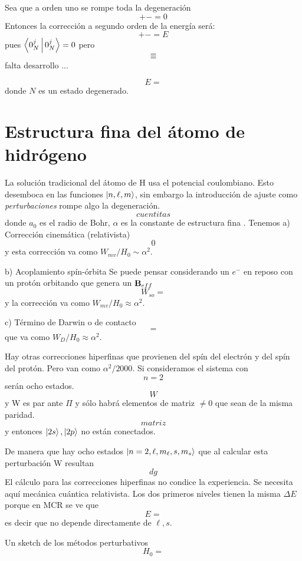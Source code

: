 \documentclass[10pt,oneside]{CBFT_book}
\begin{document}
Sea que a orden uno se rompe toda la degeneración 
\[
	+ - = 0
\]
Entonces la corrección a segundo orden de la energía será:
\[
	+ - = E
\]
pues $\Braket{0_N^j|0_N^j}= 0$ pero 
\[
	=
\]
\[
	=
\]
falta desarrollo ...

\[
	E =
\]
donde $N$ es un estado degenerado.

\section{Estructura fina del átomo de hidrógeno}

La solución tradicional del átomo de H usa el potencial coulombiano. Esto desemboca en las funciones 
$\Ket{n,\ell,m}$, sin embargo la introducción de ajuste como {\it perturbaciones} rompe algo la degeneración.
\[
	cuentitas
\]
donde $a_0$ es el radio de Bohr, $\alpha$ es la constante de estructura fina .
Tenemos 
a) Corrección cinemática (relativista)
\[	
	0
\]
y esta corrección va como $W_{mv}/H_0 \sim \alpha^2$.

b) Acoplamiento spín-órbita
Se puede pensar considerando un $e^-$ en reposo con un protón orbitando que genera un $\vb{B}_{eff}$
\[
	W_{so} =
\]
y la corrección va como $W_{mv}/H_0 \approx \alpha^2$.

c) Término de Darwin o de contacto
\[
	=
\]
que va como  $W_{D}/H_0 \approx \alpha^2$.

Hay otras correcciones hiperfinas que provienen del spín del electrón y del spín del protón. Pero van como 
$\alpha^2/2000$.
Si consideramos el sistema con 
\[
	n=2
\]
serán ocho estados.
\[
	W
\]
y W es par ante $\Pi$ y sólo habrá elementos de matriz $\neq 0$ que sean de la misma paridad.
\[
	matriz
\]
y entonces $\Ket{2s}, \Ket{2p}$ no están conectados.

De manera que hay ocho estados $\Ket{n=2,\ell,m_\ell,s,m_s}$ que al calcular esta perturbación W resultan 
\[
	dg
\]
El cálculo para las correcciones hiperfinas no condice la experiencia. Se necesita aquí mecánica cuántica 
relativista. Los dos primeros niveles tienen la misma $\Delta E$ porque en MCR se ve que 
\[
	E = 
\]
es decir que no depende directamente de $\ell,s$.

Un sketch de los métodos perturbativos
\[
	H_0 = 
\]






\end{document}
